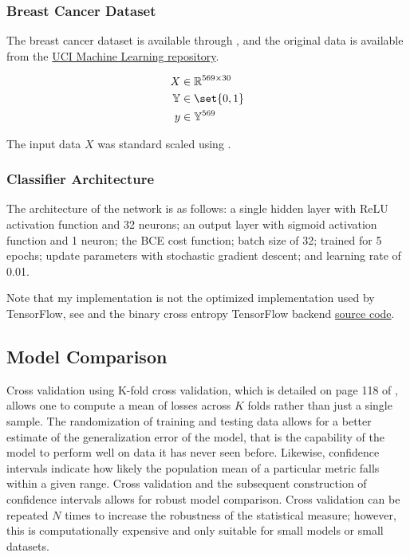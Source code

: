 \documentclass{article}
\DeclarePairedDelimiter\set\{\}
\begin{document}
\subsubsection{Breast Cancer Dataset}

The breast cancer dataset is available through , and
the original data is available from the
\href{https://archive.ics.uci.edu/ml/datasets/Breast+Cancer+Wisconsin+(Diagnostic)}{UCI Machine Learning repository}.

\begin{align}
	X          & \in \mathbb{R}^{569 \times 30} \\
	\mathbb{Y} & \in \set{0, 1}                 \\
	y          & \in \mathbb{Y}^{569}
\end{align}

The input data $X$ was standard scaled using .

\subsubsection{Classifier Architecture}

The architecture of the network is as follows: a single hidden layer with ReLU
activation function and 32 neurons; an output layer with sigmoid activation function
and 1 neuron; the BCE cost function; batch size of 32; trained for 5 epochs;
update parameters with stochastic gradient descent; and learning rate of 0.01.

Note that my implementation is not the optimized implementation used by
TensorFlow, see \cite{Khan2020} and the binary cross entropy TensorFlow backend
\href{https://github.com/keras-team/keras/blob/2c48a3b38b6b6139be2da501982fd2f61d7d48fe/keras/backend.py#L5129}{source code}.

\subsection{Model Comparison}

Cross validation using K-fold cross validation,
which is detailed on page 118 of \cite{Goodfellow2016}, allows one to compute
a mean of losses across $K$ folds rather than just a single sample. The
randomization of training and testing data allows for a better estimate of the
generalization error of the model, that is the capability of the model
to perform well on data it has never seen before. Likewise, confidence intervals
indicate how likely the population mean of a particular metric falls within a
given range. Cross validation and the subsequent construction of confidence
intervals allows for robust model comparison. Cross validation can be repeated
$N$ times to increase the robustness of the statistical measure; however, this
is computationally expensive and only suitable for small models or small
datasets.
\end{document}
